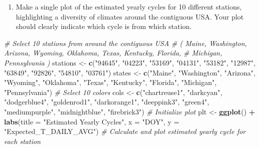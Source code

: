 \documentclass[
]{article}
\newenvironment{Shaded}{\begin{snugshade}}{\end{snugshade}}
\newcommand{\AttributeTok}[1]{\textcolor[rgb]{0.13,0.29,0.53}{#1}}
\newcommand{\CommentTok}[1]{\textcolor[rgb]{0.56,0.35,0.01}{\textit{#1}}}
\newcommand{\FunctionTok}[1]{\textcolor[rgb]{0.13,0.29,0.53}{\textbf{#1}}}
\newcommand{\NormalTok}[1]{#1}
\newcommand{\OtherTok}[1]{\textcolor[rgb]{0.56,0.35,0.01}{#1}}
\newcommand{\SpecialCharTok}[1]{\textcolor[rgb]{0.81,0.36,0.00}{\textbf{#1}}}
\newcommand{\StringTok}[1]{\textcolor[rgb]{0.31,0.60,0.02}{#1}}
\providecommand{\tightlist}{%
  \setlength{\itemsep}{0pt}\setlength{\parskip}{0pt}}
\begin{document}
\begin{enumerate}
\def\labelenumi{\arabic{enumi}.}
\setcounter{enumi}{3}
\tightlist
\item
  Make a single plot of the estimated yearly cycles for 10 different
  stations, highlighting a diversity of climates around the contiguous
  USA. Your plot should clearly indicate which cycle is from which
  station.
\end{enumerate}

\begin{Shaded}
\begin{Highlighting}[]

\CommentTok{\# Select 10 stations from around the contiguous USA}
\CommentTok{\# ( Maine, Washington, Arizona, Wyoming, Oklahoma, Texas, Kentucky, Florida, }
\CommentTok{\#   Michigan, Pennsylvania )}
\NormalTok{stations }\OtherTok{\textless{}{-}} \FunctionTok{c}\NormalTok{(}\StringTok{"94645"}\NormalTok{, }\StringTok{"04223"}\NormalTok{, }\StringTok{"53169"}\NormalTok{, }\StringTok{"04131"}\NormalTok{, }\StringTok{"53182"}\NormalTok{, }\StringTok{"12987"}\NormalTok{, }\StringTok{"63849"}\NormalTok{, }
              \StringTok{"92826"}\NormalTok{, }\StringTok{"54810"}\NormalTok{, }\StringTok{"03761"}\NormalTok{)}
\NormalTok{states }\OtherTok{\textless{}{-}} \FunctionTok{c}\NormalTok{(}\StringTok{"Maine"}\NormalTok{, }\StringTok{"Washington"}\NormalTok{, }\StringTok{"Arizona"}\NormalTok{, }\StringTok{"Wyoming"}\NormalTok{, }\StringTok{"Oklahoma"}\NormalTok{, }\StringTok{"Texas"}\NormalTok{, }
           \StringTok{"Kentucky"}\NormalTok{, }\StringTok{"Florida"}\NormalTok{, }\StringTok{"Michigan"}\NormalTok{, }\StringTok{"Pennsylvania"}\NormalTok{)}
\CommentTok{\# Select 10 colors}
\NormalTok{cols }\OtherTok{\textless{}{-}} \FunctionTok{c}\NormalTok{(}\StringTok{"chartreuse1"}\NormalTok{, }\StringTok{"darkcyan"}\NormalTok{, }\StringTok{"dodgerblue4"}\NormalTok{, }\StringTok{"goldenrod1"}\NormalTok{, }\StringTok{"darkorange1"}\NormalTok{,}
          \StringTok{"deeppink3"}\NormalTok{, }\StringTok{"green4"}\NormalTok{, }\StringTok{"mediumpurple"}\NormalTok{, }\StringTok{"midnightblue"}\NormalTok{, }\StringTok{"firebrick3"}\NormalTok{)}
\CommentTok{\# Initialize plot}
\NormalTok{plt }\OtherTok{\textless{}{-}} \FunctionTok{ggplot}\NormalTok{() }\SpecialCharTok{+} 
  \FunctionTok{labs}\NormalTok{(}\AttributeTok{title =} \StringTok{"Estimated Yearly Cycles"}\NormalTok{, }
       \AttributeTok{x =} \StringTok{"DOY"}\NormalTok{, }\AttributeTok{y =} \StringTok{"Expected\_T\_DAILY\_AVG"}\NormalTok{)}
\CommentTok{\# Calculate and plot estimated yearly cycle for each station}

\end{Highlighting}
\end{Shaded}
\end{document}
